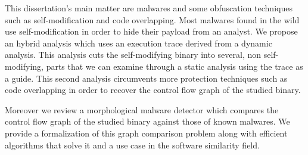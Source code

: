 This dissertation's main matter are malwares and some obfuscation techniques such as self-modification and code overlapping.
Most malwares found in the wild use self-modification in order to hide their payload from an analyst.
We propose an hybrid analysis which uses an execution trace derived from a dynamic analysis.
This analysis cuts the self-modifying binary into several, non self-modifying, parts that we can examine through a static analysis using the trace as a guide.
This second analysis circumvents more protection techniques such as code overlapping in order to recover the control flow graph of the studied binary.

Moreover we review a morphological malware detector which compares the control flow graph of the studied binary against those of known malwares.
We provide a formalization of this graph comparison problem along with efficient algorithms that solve it and a use case in the software similarity field.